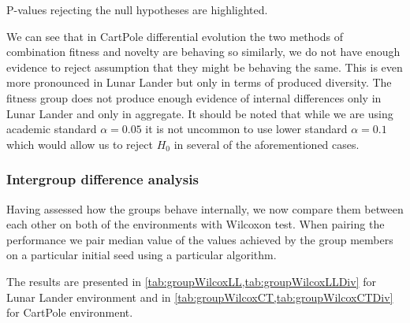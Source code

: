  P-values rejecting the null hypotheses are highlighted.
\begin{table}[h]
	\centering
	\scriptsize
	\setlength{\tabcolsep}{4pt}
	\renewcommand{\arraystretch}{1.15}
	\resizebox{\textwidth}{!}{%
		
	}
	\caption{Fitness based tests of group difference}
	\label{tab:groupcohesionFit}
\end{table}
We can see that in CartPole differential evolution the two methods of combination fitness and novelty are behaving so similarly, we do not have enough evidence to reject assumption that they might be behaving the same. 
This is even more pronounced in Lunar Lander but only in terms of produced diversity. The fitness group does not produce enough evidence of internal differences only in Lunar Lander and only in aggregate. It should be noted that while we are using academic standard $\alpha = 0.05$ it is not uncommon to use lower standard $\alpha = 0.1$ which would allow us to reject $H_0$ in several of the aforementioned cases.    
\begin{table}[h]
	\centering
	\scriptsize
	\setlength{\tabcolsep}{4pt}
	\renewcommand{\arraystretch}{1.15}
	\resizebox{\textwidth}{!}{%
		
	}
	\caption{Diversity based tests of group difference}
	\label{tab:groupcohesionDiv}
\end{table}

\subsubsection{Intergroup difference analysis}
Having assessed how the groups behave internally, we now compare them between each other on both of the environments with Wilcoxon test. When pairing the performance we pair median value of the values achieved by the group members on a particular initial seed using a particular algorithm. 

The results are presented in \cref{tab:groupWilcoxLL,tab:groupWilcoxLLDiv} for Lunar Lander environment and  in \cref{tab:groupWilcoxCT,tab:groupWilcoxCTDiv} for CartPole environment. 
\begin{table}[ht]
	\centering
	\scriptsize
	\setlength{\tabcolsep}{4pt}
	\renewcommand{\arraystretch}{1.15}
	\resizebox{\textwidth}{!}{%
		
	}
		\caption{Fitness based Wilcoxon tests of between objective groups on Lunar Lander environment. $HL_x$ denotes calculated direction of the difference (A-B) for algorithm $x$, $p_x$ is p value of the test for algorithm $x$. $Total$ denotes collection of comparisons from both ES and DE}
		\label{tab:groupWilcoxLL}
	\vspace{0.5cm}
	\resizebox{\textwidth}{!}{%
		
	}
	\caption{Diversity based Wilcoxon tests of between objective groups on Lunar Lander environment. $HL_x$ denotes calculated direction of the difference (A-B) for algorithm $x$, $p_x$ is p value of the test for algorithm $x$. $Total$ denotes collection of comparisons from both ES and DE}
		\label{tab:groupWilcoxLLDiv}
	
\end{table}


